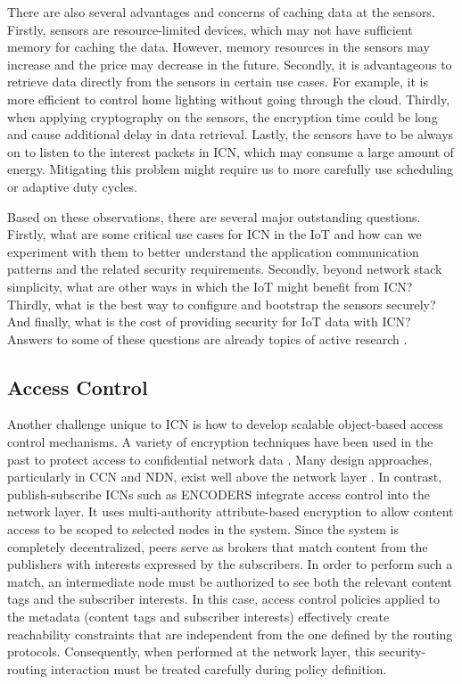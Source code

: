 There are also several advantages and concerns of caching data at the sensors. Firstly,
sensors are resource-limited devices, which may not have sufficient memory for caching the data.
However, memory resources in the sensors may increase and the
price may decrease in the future. Secondly, it is advantageous to retrieve data directly from the
sensors in certain use cases. For example, it is more efficient to control home lighting without
going through the cloud. Thirdly, when applying cryptography on  the sensors, the encryption time
could be long and cause additional delay in data retrieval. Lastly, the sensors have to be always
on to listen to the interest packets in ICN, which may consume a large amount of energy.
Mitigating this problem might require us to more carefully use scheduling or adaptive duty cycles.

Based on these observations, there are several major outstanding questions. Firstly, what are
some critical use cases for ICN in the IoT and how can we experiment with them to
better understand the application communication patterns and the related security requirements.
Secondly, beyond network stack simplicity, what are other ways in which the IoT might
benefit from ICN? Thirdly, what is the best way to configure and bootstrap the sensors securely?
And finally, what is the cost of providing security for IoT data with ICN? Answers to
some of these questions are already topics of active research \cite{shang2016named}.

\subsection{Access Control}
Another challenge unique to ICN is how to develop scalable object-based
access control mechanisms. A variety of encryption techniques have been used
in the past to protect access to confidential network data \cite{tourani2016security}.
Many design approaches, particularly in CCN and NDN, exist well above the network
layer \cite{Smetters2010,Misra2013,Ion2013,Wood2014,ifip15,yu2015name,ghali2015interest}.
In contrast, publish-subscribe ICNs such as ENCODERS \cite{raykova2015decentralized} integrate
access control into the network layer. It uses multi-authority attribute-based encryption \cite{chase2007multi}
to allow content access to be scoped to selected nodes in the system. Since the
system is completely decentralized, peers serve as brokers that match content from
the publishers with interests expressed by the subscribers. In order to perform such a match,
an intermediate node must be authorized to see both the relevant content tags and
the subscriber interests. In this case,
access control policies applied to the metadata (content tags and subscriber interests)
effectively create reachability constraints that are independent from the one defined by
the routing protocols. Consequently, when performed at the network layer,
this security-routing interaction must be treated carefully during policy definition.

